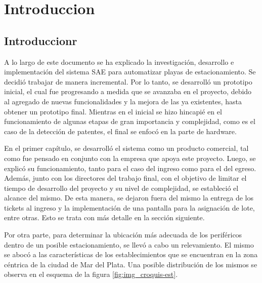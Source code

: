 \chapter{Introduccion}  \label{cap:Introduccion}

\section{Introduccionr}

A lo largo de este documento se ha explicado la investigación, desarrollo e implementación del sistema SAE para automatizar playas de estacionamiento. Se decidió trabajar de manera incremental. Por lo tanto, se desarrolló un prototipo inicial, el cual fue progresando a medida que se avanzaba en el proyecto, debido al agregado de nuevas funcionalidades y la mejora de las ya existentes, hasta obtener un prototipo final. Mientras en el inicial se hizo hincapié en el funcionamiento de algunas etapas de gran importancia y complejidad, como es el caso de la detección de patentes, el final se enfocó en la parte de hardware. 

En el primer capítulo, se desarrolló el sistema como un producto comercial, tal como fue pensado en conjunto con la empresa que apoya este proyecto. Luego, se explicó su funcionamiento, tanto para el caso del ingreso como para el del egreso. Además, junto con los directores del trabajo final, con el objetivo de limitar el tiempo de desarrollo del proyecto y su nivel de complejidad, se estableció el alcance del mismo. De esta manera, se dejaron fuera del mismo la entrega de los tickets al ingreso y la implementación de una pantalla para  la asignación de lote, entre otras. Esto se trata con más detalle en la sección siguiente.

Por otra parte, para determinar la ubicación más adecuada de los periféricos dentro de un posible estacionamiento, se llevó a cabo un relevamiento. El mismo se abocó a las características de los establecimientos que se encuentran en la zona céntrica de la ciudad de Mar del Plata. Una posible distribución de los mismos se observa en el esquema de la figura \ref{fig:img_croquis-est}.

